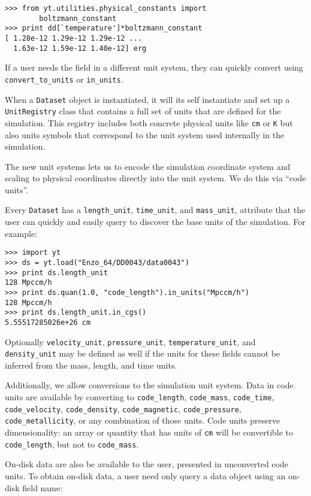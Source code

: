 \begin{Verbatim}
>>> from yt.utilities.physical_constants import
        boltzmann_constant
>>> print dd[`temperature']*boltzmann_constant 
[ 1.28e-12 1.29e-12 1.29e-12 ... 
  1.63e-12 1.59e-12 1.40e-12] erg
\end{Verbatim}

If a user needs the field in a different unit system, they can quickly convert
using \texttt{convert\_to\_units} or \texttt{in\_units}.

When a \texttt{Dataset} object is instantiated, it will its self instantiate and
set up a \texttt{UnitRegistry} class that contains a full set of units that are
defined for the simulation. This registry includes both concrete physical units
like \texttt{cm} or \texttt{K} but also units symbols that correspond to the
unit system used internally in the simulation.

The new unit systems lets us to encode the simulation coordinate system
and scaling to physical coordinates directly into the unit system. We do
this via ``code units''.

Every \texttt{Dataset} has a \texttt{length\_unit},
\texttt{time\_unit}, and \texttt{mass\_unit},
attribute that the user can quickly and easily query to discover the
base units of the simulation. For example:

\begin{Verbatim}
>>> import yt
>>> ds = yt.load("Enzo_64/DD0043/data0043")
>>> print ds.length_unit 
128 Mpccm/h
>>> print ds.quan(1.0, "code_length").in_units("Mpccm/h")
128 Mpccm/h
>>> print ds.length_unit.in_cgs()
5.55517285026e+26 cm
\end{Verbatim}

Optionally \texttt{velocity\_unit}, \texttt{pressure\_unit},
\texttt{temperature\_unit}, and \texttt{density\_unit} may be defined as well if
the units for these fields cannot be inferred from the mass, length, and time
units.

Additionally, we allow conversions to the simulation unit system. Data in code
units are available by converting to \texttt{code\_length}, \texttt{code\_mass},
\texttt{code\_time}, \texttt{code\_velocity}, \texttt{code\_density},
\texttt{code\_magnetic}, \texttt{code\_pressure}, \texttt{code\_metallicity}, or
any combination of those units. Code units preserve dimensionality: an
array or quantity that has units of \texttt{cm} will be convertible to
\texttt{code\_length}, but not to \texttt{code\_mass}.

On-disk data are also be available to the user, presented in
unconverted code units. To obtain on-disk data, a user need only query a
data object using an on-disk field name:


